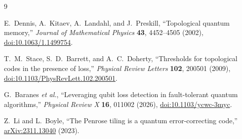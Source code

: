 \documentclass[11pt,a4paper]{article}
\begin{document}
\begin{thebibliography}{9}

E.~Dennis, A.~Kitaev, A.~Landahl, and J.~Preskill,
``Topological quantum memory,''
\textit{Journal of Mathematical Physics} \textbf{43}, 4452--4505 (2002),
\href{https://doi.org/10.1063/1.1499754}{doi:10.1063/1.1499754}.

T.~M.~Stace, S.~D.~Barrett, and A.~C.~Doherty,
``Thresholds for topological codes in the presence of loss,''
\textit{Physical Review Letters} \textbf{102}, 200501 (2009),
\href{https://doi.org/10.1103/PhysRevLett.102.200501}{doi:10.1103/PhysRevLett.102.200501}.

G.~Baranes \textit{et al.},
``Leveraging qubit loss detection in fault-tolerant quantum algorithms,''
\textit{Physical Review X} \textbf{16}, 011002 (2026),
\href{https://doi.org/10.1103/ycwc-3myc}{doi:10.1103/ycwc-3myc}.

Z.~Li and L.~Boyle,
``The Penrose tiling is a quantum error-correcting code,''
\href{https://arxiv.org/abs/2311.13040}{arXiv:2311.13040} (2023).

\end{thebibliography}
\end{document}
